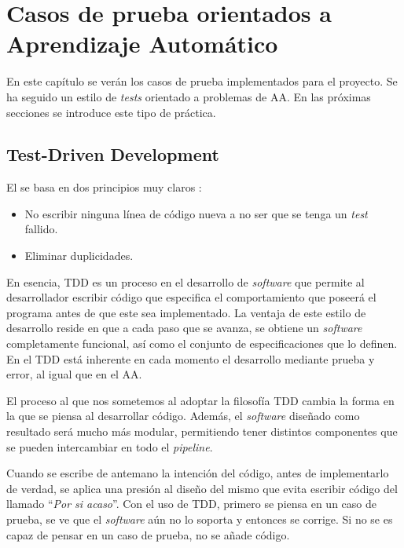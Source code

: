 \chapter{Casos de prueba orientados a Aprendizaje Automático}
\label{ch:tdml}

En este capítulo se verán los casos de prueba implementados para el proyecto. Se
ha seguido un estilo de \emph{tests} orientado a problemas de \ac{AA}. En las próximas
secciones se introduce este tipo de práctica.

\section{Test-Driven Development}
\label{sec:tdd}

El  se basa en dos principios muy claros \cite{Justin2015}:
\begin{itemize}
\item No escribir ninguna línea de código nueva a no ser que se tenga un
  \emph{test} fallido.
\item Eliminar duplicidades.
\end{itemize}

En esencia, \ac{TDD} es un proceso en el desarrollo de \emph{software} que
permite al desarrollador escribir código que especifica el comportamiento que
poseerá el programa antes de que este sea implementado. La ventaja de este
estilo de desarrollo reside en que a cada paso que se avanza, se obtiene un
\emph{software} completamente funcional, así como el conjunto de
especificaciones que lo definen. En el \ac{TDD} está inherente en cada momento
el desarrollo mediante prueba y error, al igual que en el \ac{AA}.

El proceso al que nos sometemos al adoptar la filosofía \ac{TDD} cambia la forma
en la que se piensa al desarrollar código. Además, el \emph{software} diseñado
como resultado será mucho más modular, permitiendo tener distintos componentes
que se pueden intercambiar en todo el \emph{pipeline}.

Cuando se escribe de antemano la intención del código, antes de implementarlo de
verdad, se aplica una presión al diseño del mismo que evita escribir código del
llamado ``\emph{Por si acaso}''. Con el uso de \ac{TDD}, primero se piensa en un
caso de prueba, se ve que el \emph{software} aún no lo soporta y entonces se
corrige. Si no se es capaz de pensar en un caso de prueba, no se añade código.

